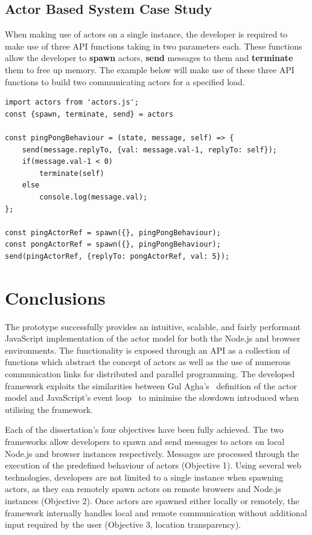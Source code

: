 \documentclass[lettersize,journal]{IEEEtran}
\begin{document}
\subsection{Actor Based System Case Study}
When making use of actors on a single instance, the developer is required to make use of three API functions taking in two parameters each. These functions allow the developer to \textbf{spawn} actors, \textbf{send} messages to them and \textbf{terminate} them to free up memory. The example below will make use of these three API functions to build two communicating actors for a specified load.
\begin{lstlisting}    
import actors from 'actors.js';
const {spawn, terminate, send} = actors

const pingPongBehaviour = (state, message, self) => {
    send(message.replyTo, {val: message.val-1, replyTo: self});
    if(message.val-1 < 0)
        terminate(self)
    else    
        console.log(message.val);
};

const pingActorRef = spawn({}, pingPongBehaviour);
const pongActorRef = spawn({}, pingPongBehaviour);
send(pingActorRef, {replyTo: pongActorRef, val: 5});
\end{lstlisting}
\section{Conclusions}
The prototype successfully provides an intuitive, scalable, and fairly performant JavaScript implementation of the actor model for both the Node.js and browser environments. The functionality is exposed through an API as a collection of functions which abstract the concept of actors as well as the use of numerous communication links for distributed and parallel programming. The developed framework exploits the similarities between Gul Agha's~\cite{agha1985actors} definition of the actor model and JavaScript's event loop~\cite{eventloopbrowser, eventloopnode} to minimise the slowdown introduced when utilising the framework. 

Each of the dissertation's four objectives have been fully achieved. The two frameworks allow developers to spawn and send messages to actors on local Node.js and browser instances respectively. Messages are processed through the execution of the predefined behaviour of actors (Objective 1). Using several web technologies, developers are not limited to a single instance when spawning actors, as they can remotely spawn actors on remote browsers and Node.js instances (Objective 2). Once actors are spawned either locally or remotely, the framework internally handles local and remote communication without additional input required by the user (Objective 3, location transparency).
\end{document}

